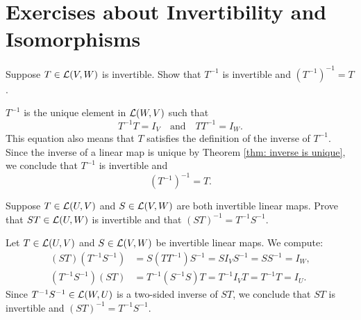 \section*{Exercises about Invertibility and Isomorphisms}

\begin{xrcs}
  Suppose $T \in \mathcal{L}(V,W)$ is invertible. Show that $T^{-1}$ is invertible and $(T^{-1})^{-1} = T$.

  \begin{xprf}
    $T^{-1}$ is the unique element in $\mathcal{L}(W,V)$ such that
    \begin{equation}
      T^{-1} T = I_V \quad \text{and} \quad TT^{-1} = I_W.
    \end{equation}
    This equation also means that $T$ satisfies the definition of the inverse of $T^{-1}$.
    Since the inverse of a linear map is unique by Theorem \ref{thm: inverse is unique}, we conclude that $T^{-1}$ is invertible and
    \begin{equation}
      (T^{-1})^{-1} = T.
    \end{equation}
  \end{xprf}
\end{xrcs}

\begin{xrcs}
  Suppose $T \in \mathcal{L}(U,V)$ and $S \in \mathcal{L}(V,W)$ are both invertible linear maps. Prove that $ST \in \mathcal{L}(U,W)$ is invertible and that $(ST)^{-1} = T^{-1} S^{-1}$.

  \begin{xprf}
    Let $T \in \mathcal{L}(U,V)$ and $S \in \mathcal{L}(V,W)$ be invertible linear maps. We compute:
    \begin{equation}
      \begin{aligned}
        (ST) (T^{-1} S^{-1}) &= S (T T^{-1}) S^{-1} = S I_V S^{-1} = S S^{-1} = I_W, \\
        (T^{-1} S^{-1}) (ST) &= T^{-1} (S^{-1} S) T = T^{-1} I_V T = T^{-1} T = I_U.
      \end{aligned}
    \end{equation}
    Since $T^{-1} S^{-1} \in \mathcal{L}(W,U)$ is a two-sided inverse of $ST$, we conclude that $ST$ is invertible and $(ST)^{-1} = T^{-1} S^{-1}$.
  \end{xprf}
\end{xrcs}

